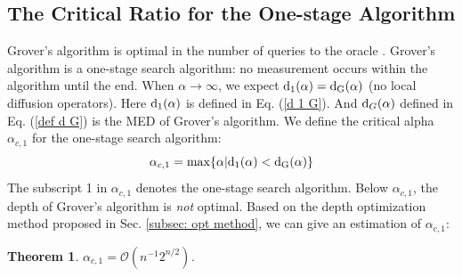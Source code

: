 \documentclass[%
 twocolumn,
 10pt,
 superscriptaddress,
 longbibliography,
 amsmath,amssymb,
 aps,
 pra,
floatfix,
]{revtex4-1}
\newcommand{\eq}{\begin{equation}}
\newcommand{\en}{\end{equation}}
\newtheorem{theo}{Theorem}
\begin{document}
\subsection{\label{sec: one stage alpha}The Critical Ratio for the One-stage Algorithm}

Grover's algorithm is optimal in the number of queries to the oracle \cite{BBHT98,Zalka99}. Grover's algorithm is a one-stage search algorithm: no measurement occurs within the algorithm until the end. When $\alpha\rightarrow\infty$, we expect ${\rm d}_1(\alpha)=\text d_\text{G}(\alpha)$ (no local diffusion operators). Here ${\rm d}_1(\alpha)$ is defined in Eq. (\ref{d 1 G}). And $\text d_G(\alpha)$ defined in Eq. (\ref{def d G}) is the MED of Grover's algorithm. We define the critical alpha $\alpha_{c,1}$ for the one-stage search algorithm:
\eq
\label{def alpha c}
\alpha_{c,1}=\max\{\alpha|{\text d}_1(\alpha) <{\text d}_{\text G}(\alpha)\}
\en
The subscript 1 in $\alpha_{c,1}$ denotes the one-stage search algorithm. Below $\alpha_{c,1}$, the depth of Grover's algorithm is {\it not} optimal. Based on the depth optimization method proposed in Sec. \ref{subsec: opt method}, we can give an estimation of $\alpha_{c,1}$:
\begin{theo}
	\label{theorem 1} $\alpha_{c,1}=\mathcal O(n^{-1}2^{n/2})$.
\end{theo}
\end{document}
